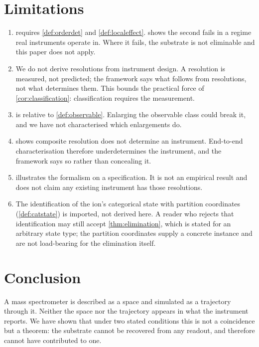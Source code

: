 \documentclass[11pt,a4paper]{article}
\theoremstyle{plain}
\theoremstyle{definition}
\theoremstyle{remark}
\begin{document}
\section{Limitations}
\label{sec:limitations}

\begin{enumerate}[leftmargin=2em,itemsep=0.4em]
\item {} requires \cref{def:orderdet} and
\cref{def:localeffect}.  shows the second fails in a
regime real instruments operate in. Where it fails, the substrate is not
eliminable and this paper does not apply.
\item We do not derive resolutions from instrument design. A resolution is
measured, not predicted; the framework says what follows from resolutions, not
what determines them. This bounds the practical force of
\cref{cor:classification}: classification requires the measurement.
\item {} is relative to \cref{def:observable}. Enlarging the
observable class could break it, and we have not characterised which
enlargements do.
\item {} shows composite resolution does not determine an
instrument. End-to-end characterisation therefore underdetermines the
instrument, and the framework says so rather than concealing it.
\item {} illustrates the formalism on a specification. It is not an
empirical result and does not claim any existing instrument has those
resolutions.
\item The identification of the ion's categorical state with partition
coordinates (\cref{def:catstate}) is imported, not derived here. A reader who
rejects that identification may still accept
\cref{thm:elimination}, which is stated for an arbitrary state type; the
partition coordinates supply a concrete instance and are not load-bearing for
the elimination itself.
\end{enumerate}

\section{Conclusion}
\label{sec:conclusion}

A mass spectrometer is described as a space and simulated as a trajectory
through it. Neither the space nor the trajectory appears in what the instrument
reports. We have shown that under two stated conditions this is not a
coincidence but a theorem: the substrate cannot be recovered from any readout,
and therefore cannot have contributed to one.
\end{document}
